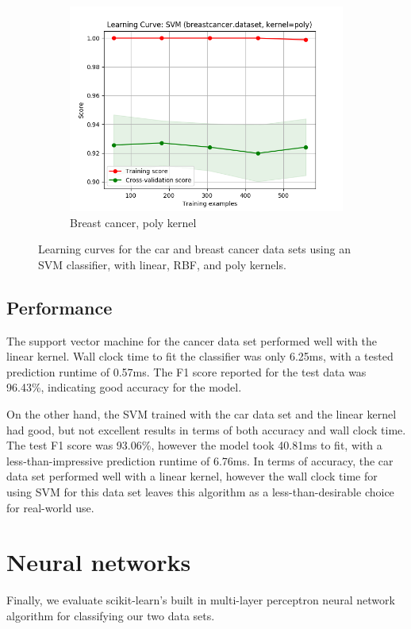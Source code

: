 \documentclass{article}
\begin{document}
\begin{figure}[htb]
\begin{subfigure}{0.33\textwidth}
      \includegraphics[width=\linewidth]{out/svm/breastcancer-kernel-poly.png}
      \caption{Breast cancer, poly kernel}
      \label{fig:svm-learning-6}
    \end{subfigure}

    \caption{Learning curves for the car and breast cancer data sets using an SVM classifier, with linear, RBF, and poly kernels.}
    \label{fig:svm-learning}
    \end{figure}

    \subsection{Performance}
    The support vector machine for the cancer data set performed well with the linear kernel. Wall clock time to fit the classifier was only 6.25ms, with a tested prediction runtime of 0.57ms. The F1 score reported for the test data was 96.43\%, indicating good accuracy for the model.

    On the other hand, the SVM trained with the car data set and the linear kernel had good, but not excellent results in terms of both accuracy and wall clock time. The test F1 score was 93.06\%, however the model took 40.81ms to fit, with a less-than-impressive prediction runtime of 6.76ms. In terms of accuracy, the car data set performed well with a linear kernel, however the wall clock time for using SVM for this data set leaves this algorithm as a less-than-desirable choice for real-world use.

    \section{Neural networks}
    Finally, we evaluate scikit-learn's built in multi-layer perceptron neural network algorithm for classifying our two data sets.
\end{document}
